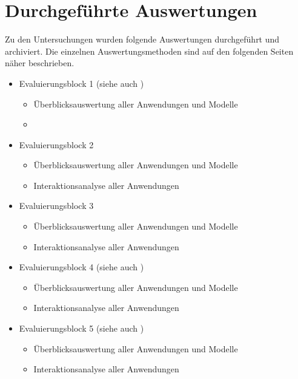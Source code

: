 
\section{Durchgeführte Auswertungen} %
\label{sec:durchgeführte_auswertungen}

Zu den Untersuchungen wurden folgende Auswertungen durchgeführt und archiviert. Die einzelnen Auswertungsmethoden sind auf den folgenden Seiten näher beschrieben.

\begin{itemize}
	\item Evaluierungsblock 1 (siehe auch \citep{Bohninger10})
		\begin{itemize}
			\item Überblicksauswertung aller Anwendungen und Modelle
			\item  
		\end{itemize}
	\item Evaluierungsblock 2
		\begin{itemize}
			\item Überblicksauswertung aller Anwendungen und Modelle
			\item Interaktionsanalyse aller Anwendungen
		\end{itemize}
	\item Evaluierungsblock 3
		\begin{itemize}
			\item Überblicksauswertung aller Anwendungen und Modelle
			\item Interaktionsanalyse aller Anwendungen
		\end{itemize}
	\item Evaluierungsblock 4 (siehe auch \citep{Wahlmuller10})
		\begin{itemize}
			\item Überblicksauswertung aller Anwendungen und Modelle
			\item Interaktionsanalyse aller Anwendungen
		\end{itemize}
	\item Evaluierungsblock 5 (siehe auch \citep{Bindreiter10})
		\begin{itemize}
			\item Überblicksauswertung aller Anwendungen und Modelle
			\item Interaktionsanalyse aller Anwendungen
		\end{itemize}
\end{itemize}

